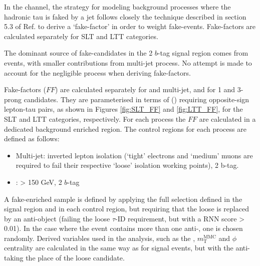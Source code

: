 In the \lephad channel, the strategy for modeling background processes where the hadronic tau is faked by a jet follows 
closely the technique described in section 5.3 of Ref.\cite{AlvarezPiqueras:2131232} to derive a \tauhad `fake-factor' 
in order to weight fake-\tauhad events. Fake-factors are calculated separately for SLT and LTT categories. 

The dominant source of fake-\tauhad candidates in the 2 $b$-tag signal region comes from \ttbar events, with smaller contributions from multi-jet process. 
No attempt is made to account for the negligible \Wjets process  when deriving fake-factors.

Fake-factors ($FF$) are calculated separately for \ttbar and multi-jet, and for 1 and 3-prong \tauhad candidates. 
They are parameterised in terms of \pT(\tauhad) requiring opposite-sign lepton-tau pairs, as shown in Figures \ref{fig:SLT_FF} and \ref{fig:LTT_FF}, for the SLT and LTT categories, respectively.
For each process the $FF$ are calculated in a dedicated background enriched region. The control regions for each process are defined as follows:
 \begin{itemize}
 	\item Multi-jet: inverted lepton isolation (`tight' electrons and `medium' muons are required to fail their respective 
	 `loose' isolation working points), 2 b-tag. 
 	\item \ttbar: \mbb > 150 GeV, 2 $b$-tag 
 \end{itemize}
 
A fake-\tauhad enriched sample is defined by applying the full selection defined in the signal region and in each control region, 
but requiring that the loose \tauhad is replaced by an anti-\tauhad object (failing the loose $\tau$-ID requirement, but with a RNN score > 0.01). 
In the case where the event contains more than one anti-\tauhad, one is chosen randomly. Derived variables used in the analysis,
such as the \MET, $m^{\mathrm{MMC}}_\mathrm{T}$ and \MET$\phi$ centrality are calculated in the same way as for signal events, 
but with the anti-\tauhad taking the place of the loose \tauhad candidate.


